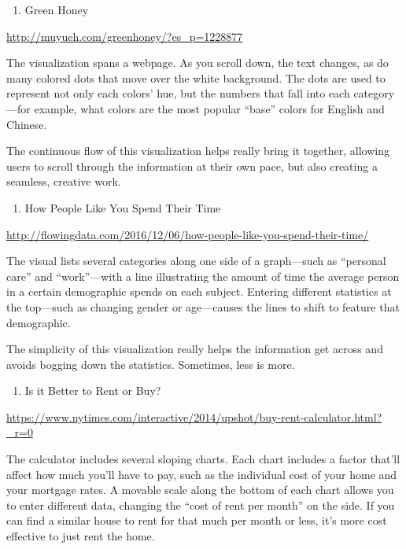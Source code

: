 \documentclass[]{book}
\providecommand{\tightlist}{%
  \setlength{\itemsep}{0pt}\setlength{\parskip}{0pt}}
\theoremstyle{definition}
\theoremstyle{definition}
\theoremstyle{definition}
\theoremstyle{remark}
\begin{document}
\begin{enumerate}
\def\labelenumi{\arabic{enumi}.}
\setcounter{enumi}{2}
\tightlist
\item
  Green Honey
\end{enumerate}

\url{http://muyueh.com/greenhoney/?es_p=1228877}

The visualization spans a webpage. As you scroll down, the text changes,
as do many colored dots that move over the white background. The dots
are used to represent not only each colors' hue, but the numbers that
fall into each category---for example, what colors are the most popular
``base'' colors for English and Chinese.

The continuous flow of this visualization helps really bring it
together, allowing users to scroll through the information at their own
pace, but also creating a seamless, creative work.

\begin{enumerate}
\def\labelenumi{\arabic{enumi}.}
\setcounter{enumi}{3}
\tightlist
\item
  How People Like You Spend Their Time
\end{enumerate}

\url{http://flowingdata.com/2016/12/06/how-people-like-you-spend-their-time/}

The visual lists several categories along one side of a graph---such as
``personal care'' and ``work''---with a line illustrating the amount of
time the average person in a certain demographic spends on each subject.
Entering different statistics at the top---such as changing gender or
age---causes the lines to shift to feature that demographic.

The simplicity of this visualization really helps the information get
across and avoids bogging down the statistics. Sometimes, less is more.

\begin{enumerate}
\def\labelenumi{\arabic{enumi}.}
\setcounter{enumi}{4}
\tightlist
\item
  Is it Better to Rent or Buy?
\end{enumerate}

\url{https://www.nytimes.com/interactive/2014/upshot/buy-rent-calculator.html?_r=0}

The calculator includes several sloping charts. Each chart includes a
factor that'll affect how much you'll have to pay, such as the
individual cost of your home and your mortgage rates. A movable scale
along the bottom of each chart allows you to enter different data,
changing the ``cost of rent per month'' on the side. If you can find a
similar house to rent for that much per month or less, it's more cost
effective to just rent the home.
\end{document}
